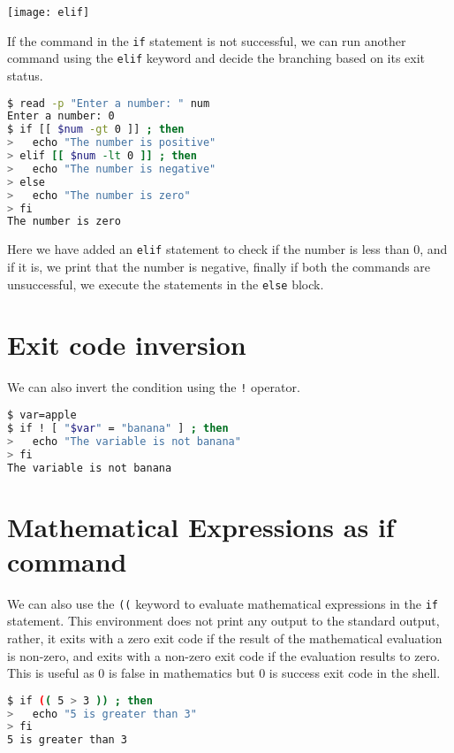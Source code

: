 \begin{marginfigure}
  \texttt{[image: elif]}
  \caption{Flowchart of the \lstinline{if}, \lstinline{elif}, and \lstinline{else} construct}
\end{marginfigure}

If the command in the \lstinline{if} statement is not successful, we can run another command using the \lstinline{elif} keyword and decide the branching based on its exit status.

\begin{lstlisting}[language=bash]
$ read -p "Enter a number: " num
Enter a number: 0
$ if [[ $num -gt 0 ]] ; then
>   echo "The number is positive"
> elif [[ $num -lt 0 ]] ; then
>   echo "The number is negative"
> else
>   echo "The number is zero"
> fi
The number is zero
\end{lstlisting}

Here we have added an \lstinline{elif} statement to check if the number is less than 0, and if it is, we print that the number is negative, finally if both the commands are unsuccessful, we execute the statements in the \lstinline|else| block.

\section{Exit code inversion}

We can also invert the condition using the \lstinline{!} operator.

\begin{lstlisting}[language=bash]
$ var=apple
$ if ! [ "$var" = "banana" ] ; then
>   echo "The variable is not banana"
> fi
The variable is not banana
\end{lstlisting}

\section{Mathematical Expressions as if command}

We can also use the \lstinline{((} keyword to evaluate mathematical expressions in the \lstinline{if} statement. This environment does not print any output to the standard output, rather, it exits with a zero exit code if the result of the mathematical evaluation is non-zero, and exits with a non-zero exit code if the evaluation results to zero. This is useful as $0$ is false in mathematics but $0$ is success exit code in the shell.

\begin{lstlisting}[language=bash]
$ if (( 5 > 3 )) ; then
>   echo "5 is greater than 3"
> fi
5 is greater than 3
\end{lstlisting}

